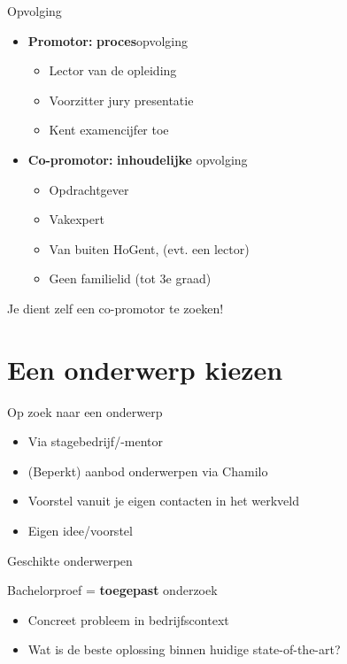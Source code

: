 \documentclass[aspectratio=169]{beamer}
\begin{document}
\begin{frame}{Opvolging}
  
  \begin{itemize}
    \item \textbf{Promotor:} \textbf{proces}opvolging
    \begin{itemize}
      \item Lector van de opleiding
      \item Voorzitter jury presentatie
      \item Kent examencijfer toe
    \end{itemize}
    \item \textbf{Co-promotor:} \textbf{inhoudelijke} opvolging
    \begin{itemize}
      \item Opdrachtgever
      \item Vakexpert
      \item Van buiten HoGent, (evt. een lector)
      \item Geen familielid (tot 3e graad)
    \end{itemize}
  \end{itemize}
  
  Je dient zelf een co-promotor te zoeken!
  
\end{frame}

\section{Een onderwerp kiezen}

\begin{frame}{Op zoek naar een onderwerp}
  
  \begin{itemize}
    \item Via stagebedrijf/-mentor
    \item (Beperkt) aanbod onderwerpen via Chamilo
    \item Voorstel vanuit je eigen contacten in het werkveld
    \item Eigen idee/voorstel
  \end{itemize}
  
\end{frame}

\begin{frame}{Geschikte onderwerpen}
  
  Bachelorproef = \textbf{toegepast} onderzoek
  
  \begin{itemize}
    \item Concreet probleem in bedrijfscontext
    \item Wat is de beste oplossing binnen huidige state-of-the-art?
  \end{itemize}
  
\end{frame}
\end{document}
